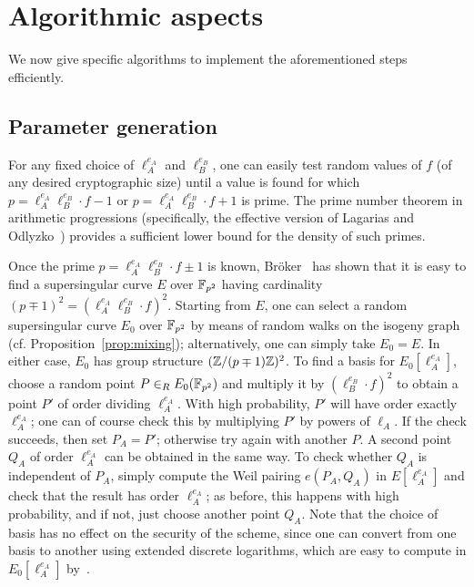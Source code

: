 \section{Algorithmic aspects}\label{sec:alg}

We now give specific algorithms to implement the aforementioned steps
efficiently. 

\subsection{Parameter generation}\label{subsec:parameter}

For any fixed choice of $\ell_A^{e_A}$ and $\ell_B^{e_B}$, one can
easily test random values of $f$ (of any desired cryptographic size)
until a value is found for which $p=\ell_A^{e_A} \ell_B^{e_B}\cdot f -
1$ or $p=\ell_A^{e_A} \ell_B^{e_B}\cdot f + 1$ is prime. The prime
number theorem in arithmetic progressions (specifically, the effective
version of Lagarias and Odlyzko~\cite{lo}) provides a sufficient lower
bound for the density of such primes. 

Once the prime $p= \ell_A^{e_A} \ell_B^{e_B}\cdot f \pm 1$ is known,
Br\"oker~\cite{broker-ss} has shown that it is easy to find a
supersingular curve $E$ over ${\mathbb{F}}_{p^2}$ having cardinality $(p\mp
1)^2 = (\ell_A^{e_A} \ell_B^{e_B}\cdot f)^2$. Starting from $E$, one
can select a random supersingular curve $E_0$ over ${\mathbb{F}}_{p^2}$ by
means of random walks on the isogeny graph
(cf. Proposition~\ref{prop:mixing});
alternatively, one can simply take $E_0 = E$. In either case, $E_0$
has group structure $({\mathbb{Z}}/(p\mp 1){\mathbb{Z}})^2$. To find a basis for
$E_0[\ell_A^{e_A}]$, choose a random point $P \in_R E_0({\mathbb{F}}_{p^2})$
and multiply it by $(\ell_B^{e_B}\cdot f)^2$ to obtain a point $P'$ of
order dividing $\ell_A^{e_A}$. With high probability, $P'$ will have
order exactly $\ell_A^{e_A}$; one can of course check this by
multiplying $P'$ by powers of $\ell_A$. If the check succeeds, then
set $P_A = P'$; otherwise try again with another $P$. A second point
$Q_A$ of order $\ell_A^{e_A}$ can be obtained in the same way.  To
check whether $Q_A$ is independent of $P_A$, simply compute the Weil
pairing $e(P_A,Q_A)$ in $E[\ell_A^{e_A}]$ and check that the result
has order $\ell_A^{e_A}$; as before, this happens with high
probability, and if not, just choose another point $Q_A$. Note that
the choice of basis has no effect on the security of the scheme, since
one can convert from one basis to another using extended discrete
logarithms, which are easy to compute in $E_0[\ell_A^{e_A}]$
by~\cite{teske-ph}.

